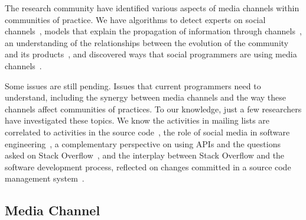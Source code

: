 
    The research community have identified various aspects of media channels within communities of practice.
    We have algorithms to detect experts on social channels~\cite{Pal2011a,Pal2012a}, models that explain the propagation of information through channels~\cite{Jin2013, Jiang2013}, an understanding of the relationships between the evolution of the community and its products~\cite{German2013}, and discovered ways that social programmers are using media channels~\cite{Sowe2008a, Singh2009, Parnin2013}.

    Some issues are still pending.
    Issues that current programmers need to understand, including the synergy between media channels and the way these channels affect communities of practices.
    To our knowledge, just a few researchers have investigated these topics.
    We know the activities in mailing lists are correlated to activities in the source code~\cite{Bird2006}, the role of social media in software engineering~\cite{Storey2014, Storey2010}, a complementary perspective on using APIs and the questions asked on Stack Overflow~\cite{Kavaler2013}, and the interplay between Stack Overflow and the software development process, reflected on changes committed in a source code management system~\cite{Vasilescu2013a}.

\subsection{Media Channel}

